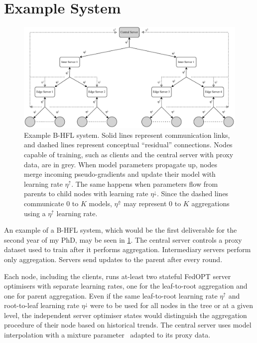 \section{Example System}\label{sec:example_system}
\begin{figure}[h]
    \centering
    \includegraphics[clip,width=\columnwidth]{plots/Tree_Structure.drawio.pdf}
    \caption[System Diagram]{Example B-HFL system. Solid lines represent communication links, and dashed lines represent conceptual ``residual'' connections. Nodes capable of training, such as clients and the central server with proxy data, are in grey. When model parameters propagate up, nodes merge incoming pseudo-gradients and update their model with learning rate $\eta^\uparrow$. The same happens when parameters flow from parents to child nodes with learning rate $\eta^\downarrow$. Since the dashed lines communicate $0$ to $K$ models, $\eta^\Uparrow$ may represent $0$ to $K$ aggregations using a $\eta^\uparrow$ learning rate.}\label{fig:TreeStructure}
\end{figure}

An example of a B-HFL system, which would be the first deliverable for the second year of my PhD, may be seen in \cref{fig:TreeStructure}. The central server controls a proxy dataset used to train after it performs aggregation. Intermediary servers perform only aggregation. Servers send updates to the parent after every round.

Each node, including the clients, runs at-least two stateful FedOPT server optimisers with separate learning rates, one for the leaf-to-root aggregation and one for parent aggregation. Even if the same leaf-to-root learning rate $\eta^\uparrow$ and root-to-leaf learning rate $\eta^\downarrow$ were to be used for all nodes in the tree or at a given level, the independent server optimiser states would distinguish the aggregation procedure of their node based on historical trends. The central server uses model interpolation with a mixture parameter~\citep{AdaptivePersonalisedFederatedLearning} adapted to its proxy data.

